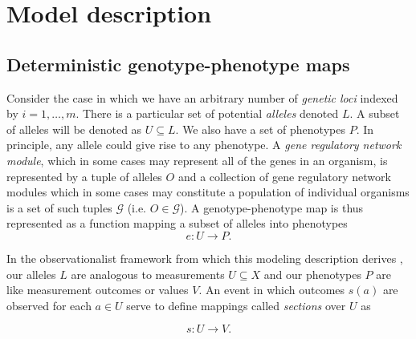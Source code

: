 \documentclass[10pt]{article}
\begin{document}
\section*{Model description}

\subsection*{Deterministic genotype-phenotype maps}
Consider the case in which we have an arbitrary number of \emph{genetic loci} indexed by $i=1, \ldots, m$. There is a particular set of potential \emph{alleles} denoted $L$. A subset of alleles will be denoted as $U \subseteq L$. We also have a set of phenotypes $P$. In principle, any allele could give rise to any phenotype. A \emph{gene regulatory network module}, which in some cases may represent all of the genes in an organism, is represented by a tuple of alleles $O$ and a collection of gene regulatory network modules which in some cases may constitute a population of individual organisms is a set of such tuples $\mathcal{G}$ (i.e. $O \in \mathcal{G}$). A genotype-phenotype map is thus represented as a function mapping a subset of alleles into phenotypes 
$$
e \colon U \rightarrow  P.
$$

In the observationalist framework from which this modeling description derives \cite{Abramsky2011}, our alleles $L$ are analogous to measurements $U \subseteq X$ and our phenotypes $P$ are like measurement outcomes or values $V$. An event in which outcomes $s(a)$ are observed for each $a \in U$ serve to define mappings called \emph{sections} over $U$ as

$$
s \colon U \rightarrow V.
$$
\end{document}
